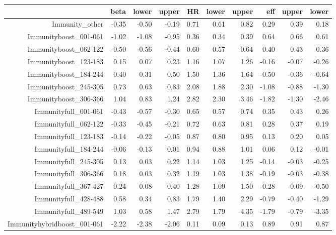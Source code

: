 \begin{table}[ht]
\centering
\begin{tabular}{rrrrrrrrrr}
  \hline
 & beta & lower & upper & HR & lower & upper & eff & upper & lower \\ 
  \hline
Immunity\_other & -0.35 & -0.50 & -0.19 & 0.71 & 0.61 & 0.82 & 0.29 & 0.39 & 0.18 \\ 
  Immunityboost\_001-061 & -1.02 & -1.08 & -0.95 & 0.36 & 0.34 & 0.39 & 0.64 & 0.66 & 0.61 \\ 
  Immunityboost\_062-122 & -0.50 & -0.56 & -0.44 & 0.60 & 0.57 & 0.64 & 0.40 & 0.43 & 0.36 \\ 
  Immunityboost\_123-183 & 0.15 & 0.07 & 0.23 & 1.16 & 1.07 & 1.26 & -0.16 & -0.07 & -0.26 \\ 
  Immunityboost\_184-244 & 0.40 & 0.31 & 0.50 & 1.50 & 1.36 & 1.64 & -0.50 & -0.36 & -0.64 \\ 
  Immunityboost\_245-305 & 0.73 & 0.63 & 0.83 & 2.08 & 1.88 & 2.30 & -1.08 & -0.88 & -1.30 \\ 
  Immunityboost\_306-366 & 1.04 & 0.83 & 1.24 & 2.82 & 2.30 & 3.46 & -1.82 & -1.30 & -2.46 \\ 
  Immunityfull\_001-061 & -0.43 & -0.57 & -0.30 & 0.65 & 0.57 & 0.74 & 0.35 & 0.43 & 0.26 \\ 
  Immunityfull\_062-122 & -0.33 & -0.45 & -0.21 & 0.72 & 0.63 & 0.81 & 0.28 & 0.37 & 0.19 \\ 
  Immunityfull\_123-183 & -0.14 & -0.22 & -0.05 & 0.87 & 0.80 & 0.95 & 0.13 & 0.20 & 0.05 \\ 
  Immunityfull\_184-244 & -0.06 & -0.13 & 0.01 & 0.94 & 0.88 & 1.01 & 0.06 & 0.12 & -0.01 \\ 
  Immunityfull\_245-305 & 0.13 & 0.03 & 0.22 & 1.14 & 1.03 & 1.25 & -0.14 & -0.03 & -0.25 \\ 
  Immunityfull\_306-366 & 0.18 & 0.03 & 0.32 & 1.19 & 1.03 & 1.38 & -0.19 & -0.03 & -0.38 \\ 
  Immunityfull\_367-427 & 0.24 & 0.08 & 0.40 & 1.28 & 1.09 & 1.50 & -0.28 & -0.09 & -0.50 \\ 
  Immunityfull\_428-488 & 0.58 & 0.34 & 0.83 & 1.79 & 1.40 & 2.29 & -0.79 & -0.40 & -1.29 \\ 
  Immunityfull\_489-549 & 1.03 & 0.58 & 1.47 & 2.79 & 1.79 & 4.35 & -1.79 & -0.79 & -3.35 \\ 
  Immunityhybridboost\_001-061 & -2.22 & -2.38 & -2.06 & 0.11 & 0.09 & 0.13 & 0.89 & 0.91 & 0.87 \\ 

\end{tabular}
\end{table}
